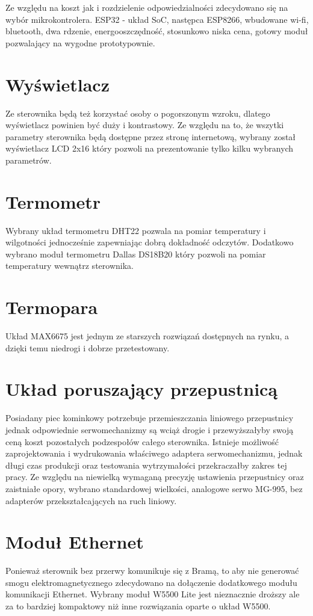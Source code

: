 \documentclass[11pt]{report}
\begin{document}
 Ze względu na koszt jak i rozdzielenie odpowiedzialności zdecydowano się na wybór mikrokontrolera.
 ESP32 - układ SoC, następca ESP8266, wbudowane wi-fi, bluetooth, dwa rdzenie, energooszczędność, stosunkowo niska cena, gotowy moduł pozwalający na wygodne prototypownie.
 
 \section{Wyświetlacz}
 Ze sterownika będą też korzystać osoby o pogorszonym wzroku, dlatego wyświetlacz powinien być duży i kontrastowy.
 Ze względu na to, że wszytki parametry sterownika będą dostępne przez stronę internetową, wybrany został wyświetlacz LCD 2x16 który pozwoli na prezentowanie tylko kilku wybranych parametrów.
 
 \section{Termometr}
 Wybrany układ termometru DHT22 pozwala na pomiar temperatury i wilgotności jednocześnie zapewniając dobrą dokładność odczytów. Dodatkowo wybrano moduł termometru Dallas DS18B20 który pozwoli na pomiar temperatury wewnątrz sterownika.
 
 \section{Termopara}
 Układ MAX6675 jest jednym ze starszych rozwiązań dostępnych na rynku, a dzięki temu niedrogi i dobrze przetestowany. 

 \section{Układ poruszający przepustnicą} 
 Posiadany piec kominkowy potrzebuje przemieszczania liniowego przepustnicy jednak odpowiednie serwomechanizmy są wciąż drogie i przewyższałyby swoją ceną koszt pozostałych podzespołów całego sterownika.
 Istnieje możliwość zaprojektowania i wydrukowania właściwego adaptera serwomechanizmu, jednak długi czas produkcji oraz testowania wytrzymałości przekraczałby zakres tej pracy.
  Ze względu na niewielką wymaganą precyzję ustawienia przepustnicy oraz zaistniałe opory, wybrano standardowej wielkości, analogowe serwo MG-995, bez adapterów przekształcających na ruch liniowy.
 
 \section{Moduł Ethernet}
 Ponieważ sterownik bez przerwy komunikuje się z Bramą, to aby nie generować smogu elektromagnetycznego zdecydowano na dołączenie dodatkowego modułu komunikacji Ethernet. Wybrany moduł W5500 Lite jest nieznacznie droższy ale za to bardziej kompaktowy niż inne rozwiązania oparte o układ W5500.
 
\end{document}
